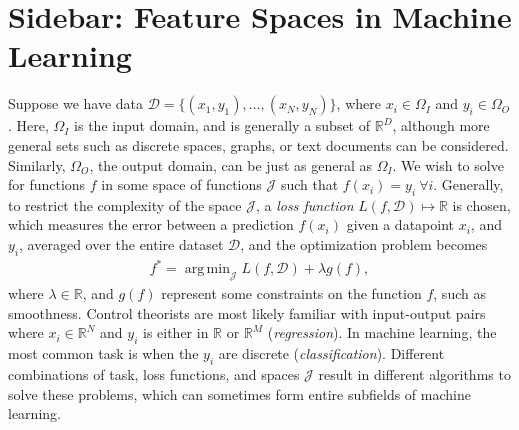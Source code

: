 \documentclass[letterpaper,12pt,peerreviewca,draftcls]{IEEEtran}
\newcommand{\la}{\lambda}
\newcommand{\R}{\mathbb{R}}
\newcommand{\domI}{\Omega_I}
\newcommand{\domO}{\Omega_O}
\newcommand{\sampSetClass}{\mathcal{D}}
\newcommand{\sampSetClassLong}{\{(x_1,y_1), \dots, (x_{\nsamp},y_{\nsamp})\}}
\newcommand{\nsamp}{N}
\DeclareMathOperator*{\argmin}{arg\,min}
\newcommand{\functionSet}{\mathcal{J}}
\begin{document}
\section[Feature Spaces in Machine Learning]{Sidebar: Feature Spaces in Machine Learning}\label{sb:featspace}
Suppose we have data $\sampSetClass = \sampSetClassLong$, where $x_i\in\domI$ and $y_i\in\domO$. Here, $\domI$ is the input domain, and 
is generally a subset of $\R^D$, although more general sets such as discrete spaces, graphs, or text documents can be considered.
Similarly, $\domO$, the output domain, can be just as general as $\domI$. We wish to solve for functions $f$ in some space 
of functions $\functionSet$ such that $f(x_i) = y_i \ \forall i$. Generally, to restrict the complexity of the space $\functionSet$,
a \emph{loss function} $L(f, \sampSetClass)\mapsto\R$ is chosen, which measures the error between a prediction $f(x_i)$ given a datapoint 
$x_i$, and $y_i$, averaged over the entire dataset $\sampSetClass$, and the optimization problem becomes 
\begin{align}
 f^* = \argmin_{\functionSet}L(f, \sampSetClass) + \la g(f),
\end{align}
where $\la\in\R$, and $g(f)$ represent some constraints on the function $f$, such as smoothness. 
Control theorists are most likely familiar with 
input-output pairs where $x_i\in\R^N$ and $y_i$ is either in $\R$ or $\R^M$ (\emph{regression}). 
In machine learning, the most common task is when the $y_i$ are discrete (\emph{classification}). 
Different combinations of task, loss functions, and spaces $\functionSet$ result in different algorithms to solve these problems,
which can sometimes form entire subfields of machine learning. 
\end{document}
